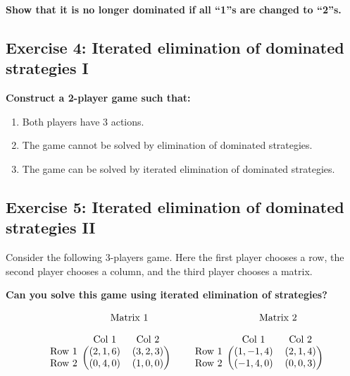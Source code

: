 \documentclass[10pt]{article}
\begin{document}
\textbf{Show that it is no longer dominated if all ``1''s are changed to ``2''s.}

\subsection*{Exercise 4: Iterated elimination of dominated strategies I}

\textbf{Construct a 2-player game such that:}

\begin{enumerate}
    \item Both players have 3 actions.
    \item The game cannot be solved by elimination of dominated strategies.
    \item The game can be solved by iterated elimination of dominated strategies.
\end{enumerate}

\subsection*{Exercise 5: Iterated elimination of dominated strategies II}
Consider the following 3-players game. Here the first player chooses a row,
the second player chooses a column, and the third player chooses a matrix.

\textbf{Can you solve this game using iterated elimination of strategies?}

\begin{equation*}
\begin{blockarray}{ccc}
    & \BAmulticolumn{2}{c}{\text{Matrix } 1} \\ [1em]
    & \text{Col } 1 & \text{Col } 2 \\
    \begin{block}{c(cc)}
        \text{Row } 1 & (2, 1, 6) & (3, 2, 3) \\
        \text{Row } 2 & (0, 4, 0) & (1, 0, 0) \\
    \end{block}
\end{blockarray}\qquad
%
\begin{blockarray}{ccc}
    & \BAmulticolumn{2}{c}{\text{Matrix } 2} \\ [1em]
    & \text{Col } 1 & \text{Col } 2 \\
    \begin{block}{c(cc)}
        \text{Row } 1 & (1, -1, 4) & (2, 1, 4) \\
        \text{Row } 2 & (-1, 4, 0) & (0, 0, 3) \\
    \end{block}
\end{blockarray}
\end{equation*}
\end{document}
